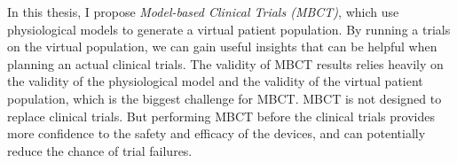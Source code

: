 \documentclass[a4paper,11pt]{article}
\begin{document}
In this thesis, I propose \emph{Model-based Clinical Trials (MBCT)}, which use physiological models to generate a virtual patient population.
By running a trials on the virtual population, we can gain useful insights that can be helpful when planning an actual clinical trials.
The validity of MBCT results relies heavily on the validity of the physiological model and the validity of the virtual patient population, which is the biggest challenge for MBCT.
MBCT is not designed to replace clinical trials.
But performing MBCT before the clinical trials provides more confidence to the safety and efficacy of the devices, and can potentially reduce the chance of trial failures.
\end{document}
